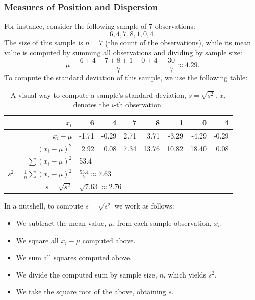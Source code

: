 \documentclass[a4paper, 11pt]{article}
\theoremstyle{definition}
\begin{document}
	\subsubsection*{Measures of Position and Dispersion}
	For instance, consider the following sample of 7 observations:
	\[6,4,7,8,1,0,4.\]
	The size of this sample is $n=7$ (the count of the observations), while its mean value is computed by summing all observations and dividing by sample size:
	\[\mu=\frac{6+4+7+8+1+0+4}{7}=\frac{30}{7}\approx4.29.\]
	To compute the standard deviation of this sample, we use the following table:
	\begin{table}[!htb]
		\centering
		\begin{tabular}{*8{r}}
			\toprule
			$x_i$ & 6 & 4 & 7 & 8 & 1 & 0 & 4 \\\midrule
			$x_i-\mu$ & -1.71 & -0.29 & 2.71 & 3.71 & -3.29 & -4.29 & -0.29 \\\midrule
			$(x_i-\mu)^2$ & 2.92 & 0.08 & 7.34 & 13.76 & 10.82 & 18.40 & 0.08 \\\midrule
			$\sum (x_i-\mu)^2$ & \multicolumn{7}{l}{53.4} \\\midrule
			$s^2=\frac{1}{n}\sum (x_i-\mu)^2$ & \multicolumn{7}{l}{$\frac{53.4}{7}\approx7.63$} \\\midrule
			$s=\sqrt{s^2}$ & \multicolumn{7}{l}{$\sqrt{7.63}\approx2.76$} \\\bottomrule
		\end{tabular}
		\caption{A visual way to compute a sample's standard deviation, $s=\sqrt{s^2}$. $x_i$ denotes the $i$-th observation.}
		\label{tab:001}
	\end{table}

	In a nutshell, to compute $s=\sqrt{s^2}$ we work as follows:
	\begin{itemize}
		\item We subtract the mean value, $\mu$, from each sample observation, $x_i$.
		\item We square all $x_i-\mu$ computed above.
		\item We sum all squares computed above.
		\item We divide the computed sum by sample size, $n$, which yields $s^2$.
		\item We take the square root of the above, obtaining $s$.
	\end{itemize}
\end{document}
